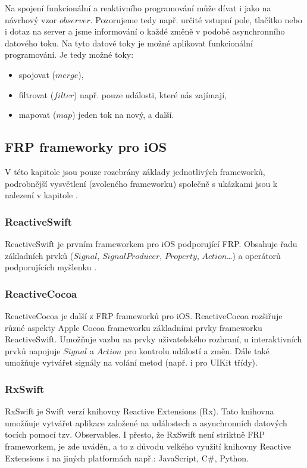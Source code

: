 \documentclass[thesis=M,czech]{FITthesis}[2012/06/26]
\begin{document}
Na spojení funkcionální a reaktivního programování může dívat i jako na návrhový vzor $observer$. \cite{Blackheath2016} Pozorujeme tedy např. určité vstupní pole, tlačítko nebo i dotaz na server a jsme informování o každé změně v podobě asynchronního datového toku. Na tyto datové toky je možné aplikovat funkcionální programování. Je tedy možné toky:
\begin{itemize}
\item spojovat ($merge$),
\item filtrovat ($filter$) např. pouze události, které nás zajímají,
\item mapovat ($map$) jeden tok na nový, a další. \cite{Ztaltz2014}
\end{itemize}

\subsection{FRP frameworky pro iOS}
V této kapitole jsou pouze rozebrány základy jednotlivých frameworků, podrobnější vysvětlení (zvoleného frameworku) společně s ukázkami jsou k nalezení v kapitole .

\subsubsection{ReactiveSwift}
ReactiveSwift je prvním frameworkem pro iOS podporující FRP. Obsahuje řadu základních prvků ($Signal$, $SignalProducer$, $Property$, $Action$\ldots) a operátorů podporujících myšlenku . \cite{ReactiveSwift}

\subsubsection{ReactiveCocoa}
ReactiveCocoa je další z FRP frameworků pro iOS. ReactiveCocoa rozšiřuje různé aspekty Apple Cocoa frameworku základními prvky frameworku ReactiveSwift. Umožňuje vazbu na prvky uživatelského rozhraní, u interaktivních prvků napojuje $Signal$ a $Action$ pro kontrolu událostí a změn. Dále také umožňuje vytvářet signály na volání metod (např. i pro UIKit třídy). \cite{ReactiveCocoa}

\subsubsection{RxSwift}
RxSwift je Swift verzí knihovny Reactive Extensions (Rx). \cite{RxSwift} Tato knihovna umožňuje vytvářet aplikace založené na událostech a asynchronních datových tocích pomocí tzv. Observables. \cite{RxNET} I přesto, že RxSwift není striktně FRP frameworkem, \cite{ReactiveExtensionsDocs} je zde uváděn, a to z důvodu velkého využití knihovny Reactive Extensions i na jiných platformách např.: JavaScript, C\#, Python. \cite{ReactiveExtensions}
\end{document}
